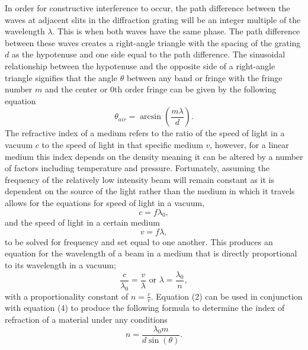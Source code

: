 \documentclass[11pt]{article}
\begin{document}
    In order for constructive interference to occur, the path difference
between the waves at adjacent slits in the diffraction grating will be
an integer multiple of the wavelength \(\lambda\). This is when both
waves have the same phase. The path difference between these waves
creates a right-angle triangle with the spacing of the grating \(d\) as
the hypotenuse and one side equal to the path difference. The sinusoidal
relationship between the hypotenuse and the opposite side of a
right-angle triangle signifies that the angle \(\theta\) between any
band or fringe with the fringe number \(m\) and the center or 0th order
fringe can be given by the following equation
\[\theta_{air} = \arcsin (\frac{m \lambda}{d}).\tag{1}\] The refractive
index of a medium refers to the ratio of the speed of light in a vacuum
\(c\) to the speed of light in that specific medium \(v\), however, for
a linear medium this index depends on the density meaning it can be
altered by a number of factors including temperature and pressure.
Fortunately, assuming the frequency of the relatively low intensity beam
will remain constant as it is dependent on the source of the light
rather than the medium in which it travels allows for the equations for
speed of light in a vacuum, \[ c = f \lambda_0, \tag{2}\] and the speed
of light in a certain medium \[ v = f \lambda, \tag{3}\] to be solved
for frequency and set equal to one another. This produces an equation
for the wavelength of a beam in a medium that is directly proportional
to its wavelength in a vacuum;
\[ \frac{c}{\lambda_0} = \frac{v}{\lambda} \text{    or    } \lambda = \frac{\lambda_0}{n}, \tag{4}\]
with a proportionality constant of \(n = \frac{c}{v}\). Equation (2) can
be used in conjunction with equation (4) to produce the following
formula to determine the index of refraction of a material under any
conditions \[n = \frac{\lambda_0 m}{d \sin(\theta)}. \tag{5}\]
\end{document}
